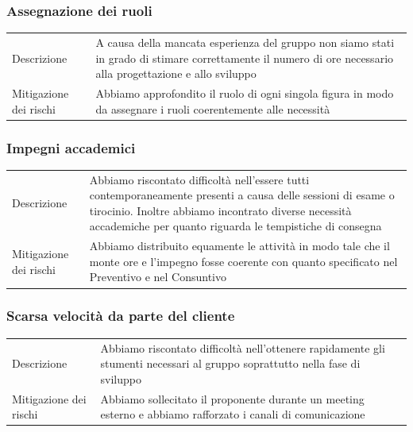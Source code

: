 \documentclass{article}
\begin{document}
\subsubsection{Assegnazione dei ruoli}
\begin{center}
\begin{tabular}{P{10em} P{20em}} 
     Descrizione &  A causa della mancata esperienza del gruppo non siamo stati in grado di stimare correttamente il numero di ore necessario alla progettazione e allo sviluppo\\ 
    Mitigazione dei rischi &  Abbiamo approfondito il ruolo di ogni singola figura in modo da assegnare i ruoli coerentemente alle necessità\\
\end{tabular}
\end{center}

\subsubsection{Impegni accademici}
\begin{center}
\begin{tabular}{P{10em} P{20em}} 
     Descrizione & Abbiamo riscontato difficoltà nell'essere tutti contemporaneamente presenti a causa delle sessioni di esame o tirocinio. Inoltre abbiamo incontrato diverse necessità accademiche per quanto riguarda le tempistiche di consegna \\ 
    Mitigazione dei rischi & Abbiamo distribuito equamente le attività in modo tale che il monte ore e l'impegno fosse coerente con quanto specificato nel Preventivo e nel Consuntivo  \\
\end{tabular}
\end{center}

\subsubsection{Scarsa velocità da parte del cliente}
\begin{center}
\begin{tabular}{P{10em} P{20em}} 
     Descrizione & Abbiamo riscontato difficoltà nell'ottenere rapidamente gli stumenti necessari al gruppo soprattutto nella fase di sviluppo \\ 
    Mitigazione dei rischi & Abbiamo sollecitato il proponente durante un meeting esterno e abbiamo rafforzato i canali di comunicazione \\
\end{tabular}
\end{center}
\end{document}
